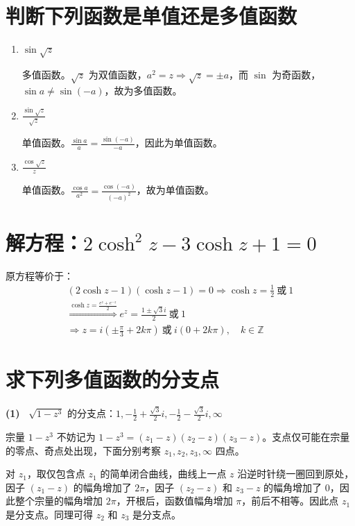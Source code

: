 \documentclass[UTF8]{report}
\def\Z{\mathbb{Z}}
\theoremstyle{MyLineTheoremStyle} %
\theoremstyle{MyBlockTheoremStyle} %
\theoremstyle{MySubsubsectionStyle} %
\begin{document}
\section{判断下列函数是单值还是多值函数}
\begin{enumerate}
\item $\sin \sqrt{z}$

多值函数。$\sqrt{z}$ 为双值函数，$a^2 = z \Longrightarrow  \sqrt{z} = \pm a $，而 $\sin $ 为奇函数，$\sin a \ne \sin (-a)$，故为多值函数。

\item $\frac{\sin \sqrt{z} }{\sqrt{z} }$

单值函数。$\frac{\sin a}{a} = \frac{\sin (-a)}{-a}$，因此为单值函数。

\item $\frac{\cos \sqrt{z} }{z }$

单值函数。$\frac{\cos a}{a^2} =\frac{\cos (-a)}{(-a)^2}$，故为单值函数。
\end{enumerate}

\section{解方程：$2\cosh^2 z - 3\cosh z + 1 = 0$}
原方程等价于：
\begin{gather}
(2\cosh z - 1)(\cosh z - 1) = 0 \Longrightarrow  \cosh z = \frac{1}{2} \ \text{或}\  1 
\\ 
\overset{\cosh z = \frac{e^{z} + e^{-z}}{2}}{\Longrightarrow } 
e^z = \frac{1 \pm \sqrt{3}i }{2}\  \text{或}\ 1 
\\ 
\Longrightarrow
z = i(\pm \frac{\pi}{3} + 2k\pi) \ \text{或}\ i(0 + 2k\pi),\quad  k \in \Z
\end{gather}

\section{求下列多值函数的分支点}

\textbf{(1)\ } $\sqrt{1 - z^3}$ 的分支点：$1, -\frac{1}{2} + \frac{\sqrt{3}}{2}i, -\frac{1}{2} - \frac{\sqrt{3}}{2}i, \infty$

宗量 $1 - z^3$ 不妨记为 $1 - z^3 = (z_1 - z)(z_2 - z)(z_3 - z)$。支点仅可能在宗量的零点、奇点处出现，下面分别考察 $z_1,z_2,z_3, \infty$ 四点。

对 $z_1$，取仅包含点 $z_1$ 的简单闭合曲线，曲线上一点 $z$ 沿逆时针绕一圈回到原处，因子 $(z_1 - z)$ 的幅角增加了 $2\pi$，因子 $(z_2 - z)$ 和 $z_3 - z$ 的幅角增加了 0，因此整个宗量的幅角增加 $2\pi$，开根后，函数值幅角增加 $\pi$，前后不相等。因此点 $z_1$ 是分支点。同理可得 $z_2$ 和 $z_3 $ 是分支点。
\end{document}
